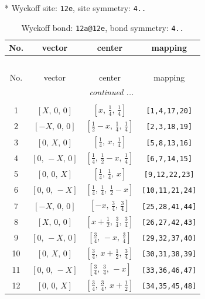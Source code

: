 \documentclass[fleqn,8pt]{jsarticle}
\begin{document}
* Wyckoff site: {\tt 12e}, site symmetry: {\tt 4..}
\renewcommand{\arraystretch}{1.2}
\begin{longtable}{cccc}
\caption{Wyckoff bond: {\tt 12a@12e}, bond symmetry: {\tt 4..}}
 \\
 \hline \hline
No. & vector & center & mapping \\ \hline \endfirsthead

\multicolumn{3}{l}{\tablename\ \thetable{}} \\
 \hline \hline
No. & vector & center & mapping \\ \hline \endhead

 \hline \hline
\multicolumn{3}{r}{\footnotesize\it continued ...} \\ \endfoot

 \hline \hline
\multicolumn{3}{r}{} \\ \endlastfoot

1 & $\left[ X,\, 0,\, 0 \right]$ & $\left[ x,\, \frac{1}{4},\, \frac{1}{4} \right]$ & {\tt [1,4,17,20]} \\ \hline
2 & $\left[ - X,\, 0,\, 0 \right]$ & $\left[ \frac{1}{2} - x,\, \frac{1}{4},\, \frac{1}{4} \right]$ & {\tt [2,3,18,19]} \\ \hline
3 & $\left[ 0,\, X,\, 0 \right]$ & $\left[ \frac{1}{4},\, x,\, \frac{1}{4} \right]$ & {\tt [5,8,13,16]} \\ \hline
4 & $\left[ 0,\, - X,\, 0 \right]$ & $\left[ \frac{1}{4},\, \frac{1}{2} - x,\, \frac{1}{4} \right]$ & {\tt [6,7,14,15]} \\ \hline
5 & $\left[ 0,\, 0,\, X \right]$ & $\left[ \frac{1}{4},\, \frac{1}{4},\, x \right]$ & {\tt [9,12,22,23]} \\ \hline
6 & $\left[ 0,\, 0,\, - X \right]$ & $\left[ \frac{1}{4},\, \frac{1}{4},\, \frac{1}{2} - x \right]$ & {\tt [10,11,21,24]} \\ \hline
7 & $\left[ - X,\, 0,\, 0 \right]$ & $\left[ - x,\, \frac{3}{4},\, \frac{3}{4} \right]$ & {\tt [25,28,41,44]} \\ \hline
8 & $\left[ X,\, 0,\, 0 \right]$ & $\left[ x + \frac{1}{2},\, \frac{3}{4},\, \frac{3}{4} \right]$ & {\tt [26,27,42,43]} \\ \hline
9 & $\left[ 0,\, - X,\, 0 \right]$ & $\left[ \frac{3}{4},\, - x,\, \frac{3}{4} \right]$ & {\tt [29,32,37,40]} \\ \hline
10 & $\left[ 0,\, X,\, 0 \right]$ & $\left[ \frac{3}{4},\, x + \frac{1}{2},\, \frac{3}{4} \right]$ & {\tt [30,31,38,39]} \\ \hline
11 & $\left[ 0,\, 0,\, - X \right]$ & $\left[ \frac{3}{4},\, \frac{3}{4},\, - x \right]$ & {\tt [33,36,46,47]} \\ \hline
12 & $\left[ 0,\, 0,\, X \right]$ & $\left[ \frac{3}{4},\, \frac{3}{4},\, x + \frac{1}{2} \right]$ & {\tt [34,35,45,48]} \\
\end{longtable}
\end{document}
